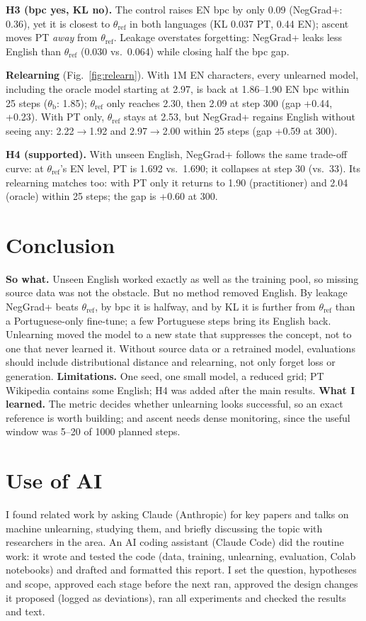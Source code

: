 \documentclass[conference]{IEEEtran}
\newcommand{\tref}{\theta_{\text{ref}}}
\newcommand{\tb}{\theta_{\text{b}}}
\begin{document}
\textbf{H3 (bpc yes, KL no).} The control raises EN bpc by only 0.09 (NegGrad+: 0.36), yet it is closest to $\tref$ in both languages (KL 0.037 PT, 0.44 EN); ascent moves PT \emph{away} from $\tref$. Leakage overstates forgetting: NegGrad+ leaks less English than $\tref$ (0.030 vs.\ 0.064) while closing half the bpc gap.

\textbf{Relearning} (Fig.~\ref{fig:relearn}). With 1M EN characters, every unlearned model, including the oracle model starting at 2.97, is back at 1.86--1.90 EN bpc within 25 steps ($\tb$: 1.85); $\tref$ only reaches 2.30, then 2.09 at step 300 (gap +0.44, +0.23). With PT only, $\tref$ stays at 2.53, but NegGrad+ regains English without seeing any: 2.22$\to$1.92 and 2.97$\to$2.00 within 25 steps (gap +0.59 at 300).

\textbf{H4 (supported).} With unseen English, NegGrad+ follows the same trade-off curve: at $\tref$'s EN level, PT is 1.692 vs.\ 1.690; it collapses at step 30 (vs.\ 33). Its relearning matches too: with PT only it returns to 1.90 (practitioner) and 2.04 (oracle) within 25 steps; the gap is +0.60 at 300.

\section{Conclusion}
\textbf{So what.} Unseen English worked exactly as well as the training pool, so missing source data was not the obstacle. But no method removed English. By leakage NegGrad+ beats $\tref$, by bpc it is halfway, and by KL it is further from $\tref$ than a Portuguese-only fine-tune; a few Portuguese steps bring its English back. Unlearning moved the model to a new state that suppresses the concept, not to one that never learned it. Without source data or a retrained model, evaluations should include distributional distance and relearning, not only forget loss or generation. \textbf{Limitations.} One seed, one small model, a reduced grid; PT Wikipedia contains some English; H4 was added after the main results. \textbf{What I learned.} The metric decides whether unlearning looks successful, so an exact reference is worth building; and ascent needs dense monitoring, since the useful window was 5--20 of 1000 planned steps.

\section{Use of AI}
I found related work by asking Claude (Anthropic) for key papers and talks on machine unlearning, studying them, and briefly discussing the topic with researchers in the area. An AI coding assistant (Claude Code) did the routine work: it wrote and tested the code (data, training, unlearning, evaluation, Colab notebooks) and drafted and formatted this report. I set the question, hypotheses and scope, approved each stage before the next ran, approved the design changes it proposed (logged as deviations), ran all experiments and checked the results and text.



\end{document}
